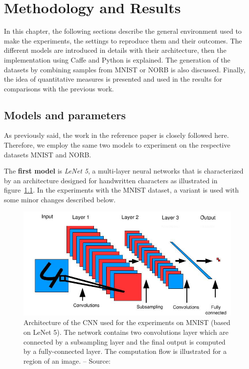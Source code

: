 \documentclass[a4paper,12pt]{report}
\begin{document}
\chapter{Methodology and Results}
\label{chap:results}

In this chapter, the following sections describe the general environment used to make the experiments, the settings to reproduce them and their outcomes.
The different models are introduced in details with their architecture, then the implementation using Caffe and Python is explained.
The generation of the datasets by combining samples from MNIST or NORB is also discussed.
Finally, the idea of quantitative measures is presented and used in the results for comparisons with the previous work.

\section{Models and parameters}

As previously said, the work in the reference paper \cite{hadsell2006dimensionality} is closely followed here.
Therefore, we employ the same two models to experiment on the respective datasets MNIST and NORB.

The {\bf first model} is {\em LeNet 5}, a multi-layer neural networks that is characterized by an architecture designed for handwritten characters as illustrated in figure~\ref{fig:siamese_cnn}.
In the experiments with the MNIST dataset, a variant is used with some minor changes described below.

\begin{figure}[t]
    \begin{center}
        \includegraphics{thesis_figures/siamese_cnn.jpg}
    \end{center}
    \caption{Architecture of the CNN used for the experiments on MNIST (based on LeNet 5). The network contains two convolutions layer which are connected by a subsampling layer and the final output is computed by a fully-connected layer. The computation flow is illustrated for a region of an image. -- Source: \cite{hadsell2006dimensionality}}
    \label{fig:siamese_cnn}
\end{figure}
\end{document}
